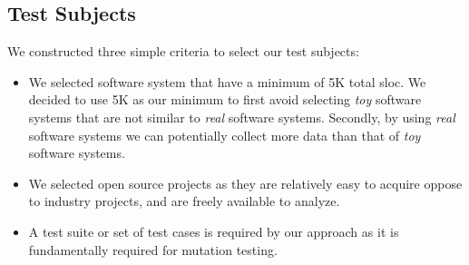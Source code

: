 \subsection{Test Subjects}
\label{subsec:experiment_test_subjects}
We constructed three simple criteria to select our test subjects:

\begin{itemize}
  \item We selected software system that have a minimum of 5K total \gls{sloc}. We decided to use 5K as our minimum to first avoid selecting \emph{toy} software systems that are not similar to \emph{real} software systems. Secondly, by using \emph{real} software systems we can potentially collect more data than that of \emph{toy} software systems.
  \item We selected open source projects as they are relatively easy to acquire oppose to industry projects, and are freely available to analyze.
  \item A test suite or set of test cases is required by our approach as it is fundamentally required for mutation testing.
\end{itemize}

